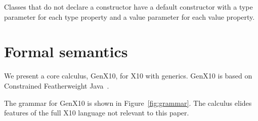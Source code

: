 \documentclass[preprint,nocopyrightspace,9pt]{sigplanconf}
\begin{document}
Classes that do not declare a constructor
have a default constructor with a type parameter for each
type property and a value parameter for each value property.

\section{Formal semantics}

\newcommand\gxx{GenX10\xspace}

We present a core calculus, \gxx, for X10 with generics.
\gxx is based on Constrained Featherweight
Java~\cite{constrained-types}.


The grammar for \gxx is shown in 
Figure~\ref{fig:grammar}.  The calculus elides features of the
full X10 language not relevant to this paper.
\end{document}
